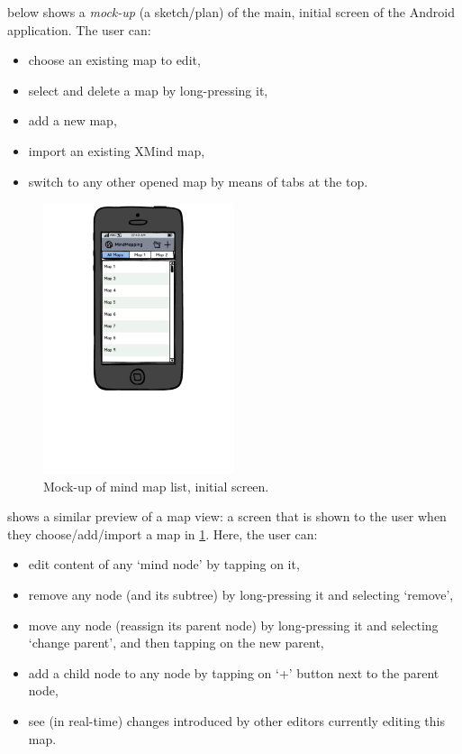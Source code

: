  below shows a \emph{mock-up} (a sketch/plan) of the main, initial screen of the Android application. The user can:

\begin{itemize}
	\item choose an existing map to edit,
	\item select and delete a map by long-pressing it,
	\item add a new map,
	\item import an existing XMind map,
	\item switch to any other opened map by means of tabs at the top.
\end{itemize}

\begin{figure}[h]
	\centering
	\includegraphics[width=0.5\textwidth]{graphics-mockup-list}
	\caption{Mock-up of mind map list, initial screen.}
	\label{fig:mockup-maplist}
\end{figure}

 shows a similar preview of a map view: a screen that is shown to the user when they choose/add/import a map in \cref{fig:mockup-maplist}. Here, the user can:

\begin{itemize}
	\item edit content of any `mind node' by tapping on it,
	\item remove any node (and its subtree) by long-pressing it and selecting `remove',
	\item move any node (reassign its parent node) by long-pressing it and selecting `change parent', and then tapping on the new parent,
	\item add a child node to any node by tapping on `+' button next to the parent node,
	\item see (in real-time) changes introduced by other editors currently editing this map.
\end{itemize}

